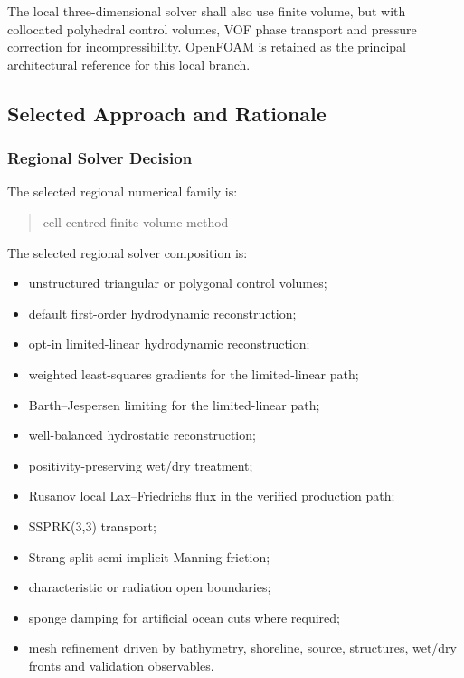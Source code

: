 The local three-dimensional solver shall also use finite volume, but
with collocated polyhedral control volumes, VOF phase transport and
pressure correction for incompressibility. OpenFOAM is retained as the
principal architectural reference for this local branch.

\subsection{Selected Approach and Rationale}
\label{sec:res-num-frm-selected-approach}


\subsubsection{Regional Solver Decision}
\label{sec:res-num-frm-regional-solver-decision}

The selected regional numerical family is:

\begin{quote}
  cell-centred finite-volume method
\end{quote}

The selected regional solver composition is:

\begin{itemize}
  \item unstructured triangular or polygonal control volumes;
  \item default first-order hydrodynamic reconstruction;
  \item opt-in limited-linear hydrodynamic reconstruction;
  \item weighted least-squares gradients for the limited-linear path;
  \item Barth--Jespersen limiting for the limited-linear path;
  \item well-balanced hydrostatic reconstruction;
  \item positivity-preserving wet/dry treatment;
  \item Rusanov local Lax--Friedrichs flux in the verified production
    path;
  \item SSPRK(3,3) transport;
  \item Strang-split semi-implicit Manning friction;
  \item characteristic or radiation open boundaries;
  \item sponge damping for artificial ocean cuts where required;
  \item mesh refinement driven by bathymetry, shoreline, source,
    structures, wet/dry fronts and validation observables.
\end{itemize}

